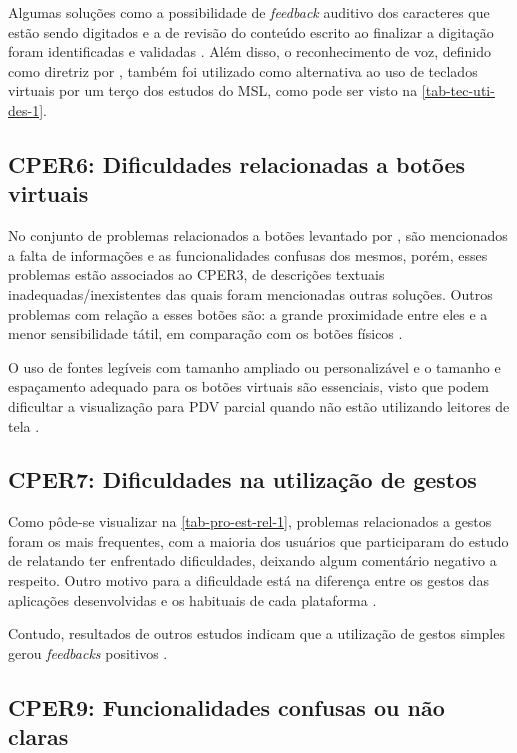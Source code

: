 Algumas soluções como a possibilidade de \emph{feedback} auditivo dos caracteres que estão sendo digitados e
a de revisão do conteúdo escrito ao finalizar a digitação foram identificadas e validadas \cite{Siebra2016, Duarte2017}.
Além disso, o reconhecimento de voz, definido como diretriz por , também foi
utilizado como alternativa ao uso de teclados virtuais por um terço dos estudos do MSL\@, como pode ser visto na \autoref{tab-tec-uti-des-1}.

\subsection{CPER6: Dificuldades relacionadas a botões virtuais}

No conjunto de problemas relacionados a botões levantado por , são mencionados a falta de informações
e as funcionalidades confusas dos mesmos, porém, esses problemas estão associados ao CPER3, de descrições textuais
inadequadas/inexistentes das quais foram mencionadas outras soluções. Outros problemas com relação a esses botões são:
a grande proximidade entre eles e a menor sensibilidade tátil, em comparação com os botões físicos \cite{Damaceno2016}.

O uso de fontes legíveis com tamanho ampliado ou personalizável e o tamanho e espaçamento adequado para os botões virtuais
são essenciais, visto que podem dificultar a visualização para PDV parcial quando não estão utilizando leitores
de tela \cite{Heesook2017,Kim20191103}.

\subsection{CPER7: Dificuldades na utilização de gestos}

Como pôde-se visualizar na \autoref{tab-pro-est-rel-1}, problemas relacionados a gestos foram os mais frequentes, com a maioria dos usuários
que participaram do estudo de  relatando ter enfrentado dificuldades, deixando algum comentário negativo a respeito.
Outro motivo para a dificuldade está na diferença entre os gestos das aplicações desenvolvidas e os habituais de cada plataforma \cite{Leporini2017}.

Contudo, resultados de outros estudos indicam que a utilização de gestos simples gerou \emph{feedbacks} positivos \cite{Duarte2017,Ducci2018}.

\subsection{CPER9: Funcionalidades confusas ou não claras}

